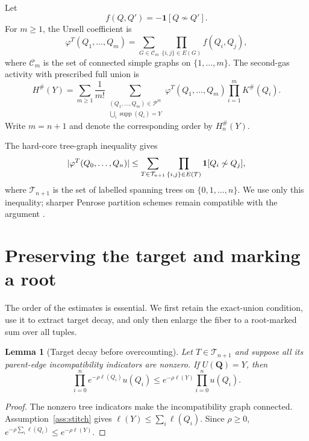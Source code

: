\documentclass[11pt,a4paper]{article}
\newtheorem{lemma}[theorem]{Lemma}
\theoremstyle{definition}
\newcommand{\supp}{\operatorname{supp}}
\newcommand{\Tree}{\mathcal T}
\newcommand{\Poly}{\mathcal P}
\newcommand{\ind}{\mathbf 1}
\newcommand{\Hsharp}{H^{\#}}
\newcommand{\Ksharp}{K^{\#}}
\DeclarePairedDelimiter{\abs}{\lvert}{\rvert}
\begin{document}
Let
\[
 f(Q,Q')=-\ind[Q\not\sim Q'].
\]
For $m\ge1$, the Ursell coefficient is
\begin{equation}
 \varphi^T(Q_1,\ldots,Q_m)
 =\sum_{G\in\mathcal C_m}\prod_{\{i,j\}\in E(G)} f(Q_i,Q_j),
 \label{eq:ursell}
\end{equation}
where $\mathcal C_m$ is the set of connected simple graphs on $\{1,\ldots,m\}$.
The second-gas activity with prescribed full union is
\begin{equation}
 \Hsharp(Y)
 =\sum_{m\ge1}\frac{1}{m!}
   \sum_{\substack{(Q_1,\ldots,Q_m)\in\Poly^m\\
                   \bigcup_i\supp(Q_i)=Y}}
   \varphi^T(Q_1,\ldots,Q_m)\prod_{i=1}^{m}\Ksharp(Q_i).
 \label{eq:hsharp}
\end{equation}
Write $m=n+1$ and denote the corresponding order by $\Hsharp_n(Y)$.

The hard-core tree-graph inequality gives
\begin{equation}
 \abs{\varphi^T(Q_0,\ldots,Q_n)}
 \le \sum_{T\in\Tree_{n+1}}
     \prod_{\{i,j\}\in E(T)}\ind[Q_i\not\sim Q_j],
 \label{eq:penrose}
\end{equation}
where $\Tree_{n+1}$ is the set of labelled spanning trees on
$\{0,1,\ldots,n\}$.  We use only this inequality; sharper Penrose partition schemes
remain compatible with the argument \cite{Brydges1986,FernandezProcacci2007}.

\section{Preserving the target and marking a root}
\label{sec:root}

The order of the estimates is essential.  We first retain the exact-union condition,
use it to extract target decay, and only then enlarge the fiber to a root-marked sum over
all tuples.

\begin{lemma}[Target decay before overcounting]
\label{lem:target-decay}
Let $T\in\Tree_{n+1}$ and suppose all its parent-edge incompatibility indicators are
nonzero.  If $U(\bm Q)=Y$, then
\[
  \prod_{i=0}^{n}e^{-\rho\ell(Q_i)}u(Q_i)
  \le e^{-\rho\ell(Y)}\prod_{i=0}^{n}u(Q_i).
\]
\end{lemma}

\begin{proof}
The nonzero tree indicators make the incompatibility graph connected.
Assumption~\ref{ass:stitch} gives $\ell(Y)\le\sum_i\ell(Q_i)$.  Since $\rho\ge0$,
$e^{-\rho\sum_i\ell(Q_i)}\le e^{-\rho\ell(Y)}$.
\end{proof}
\end{document}
